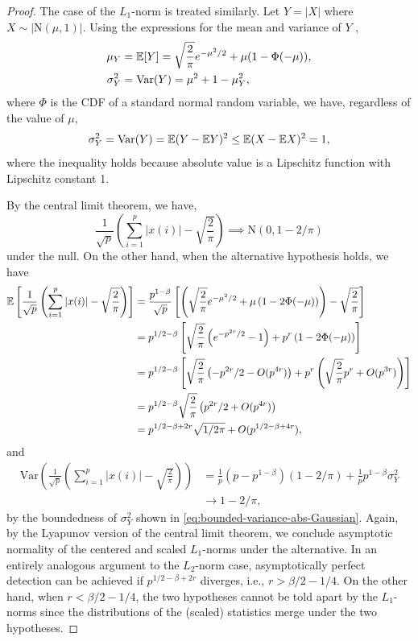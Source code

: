 \begin{proof}
The case of the $L_1$-norm is treated similarly.
Let $Y=|X|$ where $X\sim|\mathrm{N}(\mu,1)|$. 
Using the expressions for the mean and variance of $Y$ \citep[see, e.g.,][]{tsagris2014folded},
\begin{align}
    \mu_Y &= {\mathbb E}[Y] = \sqrt{\frac{2}{\pi}}e^{-\mu^2/2} + \mu(1-\Phi(-\mu)), \\
    \sigma_Y^2 &= \mathrm{Var}(Y) = \mu^2 + 1 - \mu^2_Y,
\end{align}
where $\Phi$ is the CDF of a standard normal random variable,
we have, regardless of the value of $\mu$,
\begin{equation} \label{eq:bounded-variance-abs-Gaussian}
    \sigma_Y^2 = \mathrm{Var}(Y) = {\mathbb E}(Y-{\mathbb E} Y)^2 \le {\mathbb E}(X-{\mathbb E} X)^2 = 1,
\end{equation}
where the inequality holds because absolute value is a Lipschitz function with Lipschitz constant 1.

By the central limit theorem, we have,
\begin{equation}
    \frac{1}{\sqrt{p}}\left(\sum_{i=1}^p |x(i)| - \sqrt{\frac{2}{\pi}}\right) \implies \mathrm{N}(0, 1-2/\pi)
\end{equation}
under the null.
On the other hand, when the alternative hypothesis holds, we have
\begin{align*}
    {\mathbb E} \left[ \frac{1}{\sqrt{p}} \left(\sum_{i=1}^p |x(i)| - \sqrt{\frac{2}{\pi}}\right) \right] 
    &= \frac{p^{1-\beta}}{\sqrt{p}}\left[\left(\sqrt{\frac{2}{\pi}}e^{-\mu^2/2} + \mu\left(1-2\Phi(-\mu)\right) \right) - \sqrt{\frac{2}{\pi}} \right] \\
    &= p^{1/2-\beta} \left[\sqrt{\frac{2}{\pi}}\left(e^{-p^{2r}/2} - 1 \right) + p^r\left(1-2\Phi(-\mu)\right) \right] \\
    &= p^{1/2-\beta} \left[\sqrt{\frac{2}{\pi}}\left(-p^{2r}/2 - O(p^{4r})\right) + p^r\left(\sqrt{\frac{2}{\pi}}p^r + O(p^{3r})\right) \right] \\
    &= p^{1/2-\beta} \sqrt{\frac{2}{\pi}} \left(p^{2r}/2 + O(p^{4r}) \right) \\
    &= p^{1/2-\beta+2r} \sqrt{{1}/{2\pi}} + O(p^{1/2-\beta+4r}),
\end{align*}
and 
\begin{align*}
    \mathrm{Var} \left(\frac{1}{\sqrt{p}} \left(\sum_{i=1}^p |x(i)| - \sqrt{\frac{2}{\pi}}\right) \right) 
    & = \frac{1}{p} (p-p^{1-\beta})(1-2/\pi) + \frac{1}{p} p^{1-\beta}\sigma_{Y}^2 \\
    & \to 1-2/\pi,
\end{align*}
by the boundedness of $\sigma_{Y}^2$ shown in \eqref{eq:bounded-variance-abs-Gaussian}.
Again, by the Lyapunov version of the central limit theorem, we conclude asymptotic normality of the centered and scaled $L_1$-norms under the alternative.
In an entirely analogous argument to the $L_2$-norm case, asymptotically perfect detection can be achieved if $p^{1/2-\beta+2r}$ diverges, i.e., $r>\beta/2-1/4$.
On the other hand, when $r<\beta/2-1/4$, the two hypotheses cannot be told apart by the $L_1$-norms since the distributions of the (scaled) statistics merge under the two hypotheses.
\end{proof}




